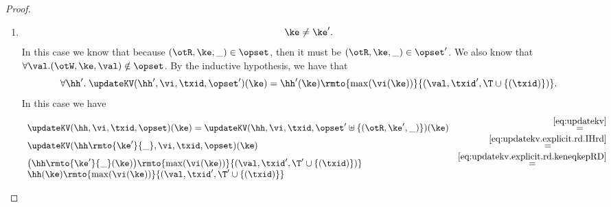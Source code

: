 \begin{proof}
\begin{enumerate}
\begin{itemize}
\begin{enumerate}
			\item \begin{equation}
			\ke \neq \ke'.
			\label{eq:updatekv.explicit.rd.keneqkepRD}
			\end{equation} 
			In this case we know that because $(\otR, \ke, \_) \in \opset$, then 
			it must be $(\otR, \ke, \_) \in \opset'$. We also know that $\forall \val.(\otW, \ke, \val) \notin \opset$. 
			By the inductive hypothesis, we have that 
			\begin{equation}
			\label{eq:updatekv.explicit.rd.IHrd}
			\forall \hh'.\; \updateKV(\hh', \vi, \txid, \opset')(\ke) = \hh'(\ke)\rmto{\max(\vi(\ke))}{(\val, \txid', \T \cup \{(\txid)\})}.
			\end{equation}
			In this case we have 
			\[
			\begin{array}{lr}
			\updateKV(\hh, \vi, \txid, \opset)(\ke) = \updateKV(\hh, \vi, \txid, \opset' \uplus \{(\otR, \ke', \_)\})(\ke) &\stackrel{\eqref{eq:updatekv}}{=}\\
			\updateKV(\hh\rmto{\ke'}{\_}, \vi, \txid, \opset)(\ke) 			&
			\stackrel{\eqref{eq:updatekv.explicit.rd.IHrd}}{=} \\
			\big(\hh\rmto{\ke'}{\_}(\ke)\big) 
			\rmto{\max(\vi(\ke))}{(\val, \txid', \T' \cup \{(\txid)\})} &\stackrel{\eqref{eq:updatekv.explicit.rd.keneqkepRD}}{=}\\
			\hh(\ke)\rmto{\max(\vi(\ke))}{(\val, \txid', \T' \cup \{(\txid)\}}
			\end{array}
			\]
		\end{enumerate}


\end{itemize}
\end{enumerate}
\end{proof}

